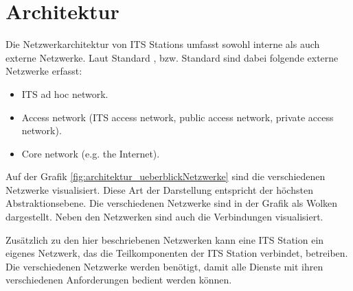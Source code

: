 \chapter{Architektur  \label{chap_archtitektur}}
Die Netzwerkarchitektur von \ac{ITS} Stations umfasst sowohl interne als auch externe Netzwerke. Laut Standard \cite{etsi302636-3}, bzw. Standard \cite{etsi102636-3} sind dabei folgende externe Netzwerke erfasst:

\begin{itemize}
 	\item ITS ad hoc network.
	\item Access network (ITS access network, public access network, private access network).
	\item Core network (e.g. the Internet).
\end{itemize}

Auf der Grafik \ref{fig:architektur_ueberblickNetzwerke} sind die verschiedenen Netzwerke visualisiert. Diese Art der Darstellung entspricht der höchsten Abstraktionsebene. Die verschiedenen Netzwerke sind in der Grafik als Wolken dargestellt. Neben den Netzwerken sind auch die Verbindungen visualisiert.


Zusätzlich zu den hier beschriebenen Netzwerken kann eine \ac{ITS} Station ein eigenes Netzwerk, das die Teilkomponenten der \ac{ITS} Station verbindet, betreiben. Die verschiedenen Netzwerke werden benötigt, damit alle Dienste mit ihren verschiedenen Anforderungen bedient werden können.

